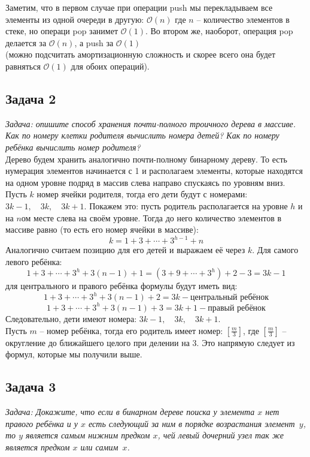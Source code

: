 \documentclass[a4paper,12pt]{article} %
\begin{document}
Заметим, что в первом случае при операции push мы перекладываем все элементы из одной очереди в другую: $ \mathcal{O}(n) $ где $ n $ -- количество элементов в стеке, но операци pop занимет $ \mathcal{O}(1)$. Во втором же, наоборот, операция pop делается за $ \mathcal{O}(n) $, а push за $ \mathcal{O}(1)$\\ (можно подсчитать амортизационную сложность и скорее всего она будет равняться $ \mathcal{O}(1)$ для обоих операций).

\subsection*{Задача 2}
\textit{Задача: опишите способ хранения почти-полного троичного дерева в массиве. Как по номеру клетки родителя вычислить номера детей? Как по номеру ребёнка вычислить номер родителя?}\\

Дерево будем хранить аналогично почти-полному бинарному дереву. То есть нумерация элементов начинается с 1 и располагаем элементы, которые находятся на одном уровне подряд в массив слева направо спускаясь по уровням вниз.\\
Пусть $ k $ номер ячейки родителя, тогда его дети будут с номерами: $ 3k - 1, \quad 3k, \quad 3k+1 $. Покажем это: пусть родитель располагается на уровне $ h $ и на $ n $ом месте слева на своём уровне. Тогда до него количество элементов в массиве равно (то есть его номер ячейки в массиве):
$$
k = 1+3+ \cdots + 3^{h-1} + n
$$
Аналогично считаем позицию для его детей и выражаем её через $ k $. Для самого левого ребёнка:
$$ 
1 + 3 + \cdots + 3^h + 3(n-1) + 1 = (3 + 9 + \cdots + 3^h) +2 - 3 = 3k - 1
$$
для центрального и правого ребёнка формулы будут иметь вид:
$$ 
1 + 3 + \cdots + 3^h + 3(n-1) + 2 = 3k - \text{центральный ребёнок}
$$
$$
1 + 3 + \cdots + 3^h + 3(n-1) + 3 = 3k + 1 - \text{правый ребёнок}
$$
Следовательно, дети имеют номера:  $ 3k - 1, \quad 3k, \quad 3k+1 $.\\

Пусть $ m $ -- номер ребёнка, тогда его родитель имеет номер: $ \left[\frac{m}{3} \right] $, где $ \left[\frac{m}{3} \right] $ -- округление до ближайшего целого при делении на 3. Это напрямую следует из формул, которые мы получили выше.



\subsection*{Задача 3}
\textit{Задача: Докажите, что если в бинарном дереве поиска у элемента $x$ нет правого ребёнка и у $x$ есть следующий за ним в порядке возрастания элемент~$y$, то $y$ является самым нижним предком $x$, чей левый дочерний узел так же является предком $x$ или самим~$x$.}\\
\end{document}
